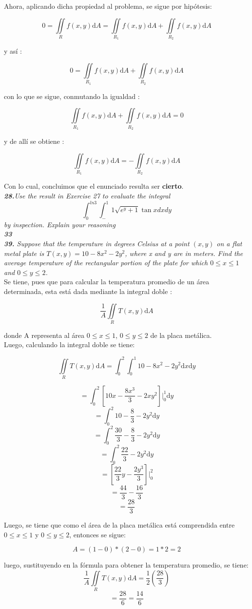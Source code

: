 \documentclass[a4paper,12pt]{article}
\begin{document}
	Ahora, aplicando dicha propiedad al problema, se sigue por hipótesis:

		$$ 0 = \iint\limits_{R} f(x,y)\mathrm{d}A
			= \iint\limits_{R_1} f(x,y)\mathrm{d}A + \iint\limits_{R_2} f(x,y)\mathrm{d}A  $$

	y así :

		$$ 0 = \iint\limits_{R_1} f(x,y)\mathrm{d}A + \iint\limits_{R_2} f(x,y)\mathrm{d}A  $$

	con lo que se sigue, conmutando la igualdad :

		$$ \iint\limits_{R_1} f(x,y)\mathrm{d}A + \iint\limits_{R_2} f(x,y)\mathrm{d}A = 0$$

	y de allí se obtiene :

		$$ \iint\limits_{R_1} f(x,y)\mathrm{d}A = - \iint\limits_{R_2} f(x,y)\mathrm{d}A $$

	Con lo cual, concluimos que el enunciado resulta ser \textbf{cierto}.\\

	\textit{\textbf{28.}Use the result in Exercise 27 to evaluate the integral
	\[\int^{ln 3}_{0} \int^1_-1 \sqrt{e^y + 1}\tan x dx dy\]
	by inspection. Explain your reasoning}\ \\

	\textit{\textbf{33}}\\

	\textit{\textbf{39.} Suppose that the temperature in degrees Celsius at a
	point $(x,y)$ on a flat metal plate is $ T(x,y)=10 - 8x^2 - 2y^2$, where x
	and y are in meters. Find the average temperature of the rectangular portion
	of the plate for which $0 \leq x \leq 1$ and $0 \leq y \leq 2$.}\\

	Se tiene, pues que para calcular la temperatura promedio de un área
	determinada, esta está dada mediante la integral doble :

		$$ \frac{1}{A}  \iint\limits_{R} T(x,y)\mathrm{d}A   $$

	donde A representa al área $ 0 \leq x \leq 1$, $ 0 \leq y \leq 2 $ de la
	placa metálica.\\

	Luego, calculando la integral doble se tiene:

		$$ \iint\limits_{R} T(x,y)\mathrm{d}A  =
			\int_{0}^{2} \int_{0}^{1} 10 - 8x^2 - 2y^2 \mathrm{d}x \mathrm{d}y   $$

		$$ = \int_{0}^{2} [ 10x - \frac{8x^3}{3} - 2xy^2 ] \Big|_0^1 \mathrm{d}y $$
		$$ = \int_{0}^{2} 10 - \frac{8}{3} - 2y^2  \mathrm{d}y $$
		$$ = \int_{0}^{2} \frac{30}{3} - \frac{8}{3} - 2y^2 \mathrm{d}y $$
		$$ = \int_{0}^{2} \frac{22}{3} - 2y^2 \mathrm{d}y $$
		$$ = [ \frac{22}{3}y - \frac{2y^3}{3} ] \Big|_0^2$$
		$$ = \frac{44}{3} - \frac{16}{3} $$
		$$ = \frac{28}{3} $$

	Luego, se tiene que como el área de la placa metálica está comprendida entre
	$ 0 \leq x \leq 1 $ y $ 0 \leq y \leq 2 $, entonces se sigue:

	 	$$ A = (1 - 0) * (2 - 0) = 1 * 2 = 2  $$

	luego, sustituyendo en la fórmula para obtener la temperatura promedio, se
	tiene:
		$$ \frac{1}{A}  \iint\limits_{R} T(x,y)\mathrm{d}A  = \frac{1}{2} (\frac{28}{3}) $$
		$$ = \frac{28}{6} = \frac{14}{6} $$
\end{document}
